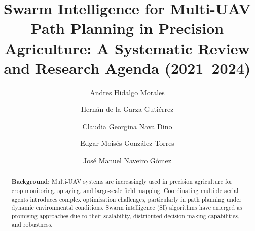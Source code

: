 \documentclass[review,3p,times]{elsarticle}
\begin{document}
\begin{frontmatter}
\title{Swarm Intelligence for Multi-UAV Path Planning in Precision Agriculture: A Systematic Review and Research Agenda (2021--2024)}

\author{\texorpdfstring{Andres Hidalgo Morales}{Andres Hidalgo Morales}}

\author{\texorpdfstring{Hernán de la Garza Gutiérrez}{Hernán de la Garza Gutiérrez}}

\author{\texorpdfstring{Claudia Georgina Nava Dino}{Claudia Georgina Nava Dino}}

\author{\texorpdfstring{Edgar Moisés González Torres}{Edgar Moisés González Torres}}

\author{\texorpdfstring{José Manuel Naveiro Gómez}{José Manuel Naveiro Gómez}}


\address[1]{Instituto Tecnológico de Chihuahua II, Tecnológico Nacional de México, Chihuahua, México}
\address[2]{Universidad Politécnica de Chihuahua, Chihuahua, México}
\address[3]{Facultad de Ingeniería, Universidad Autónoma de Chihuahua, Chihuahua, México}
\address[4]{Departamento de Ingeniería Mecánica, Universidad de Zaragoza, Zaragoza, España}

\begin{abstract}
\textbf{Background:} Multi-UAV systems are increasingly used in precision agriculture
for crop monitoring, spraying, and large-scale field mapping. Coordinating multiple
aerial agents introduces complex optimisation challenges, particularly in path planning
under dynamic environmental conditions. Swarm intelligence (SI) algorithms have
emerged as promising approaches due to their scalability, distributed decision-making
capabilities, and robustness.


\end{abstract}
\end{frontmatter}
\end{document}

